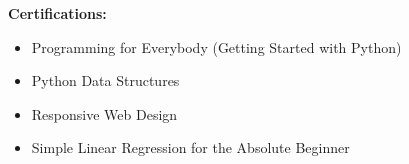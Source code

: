 \documentclass[a4paper,10pt]{article}
\begin{document}
\vspace{10pt}
{\Large \textbf{Certifications:}} %
\begin{itemize}
    \item Programming for Everybody (Getting Started with Python)
    \item Python Data Structures
    \item Responsive Web Design
    \item Simple Linear Regression for the Absolute Beginner
\end{itemize}
\end{document}
